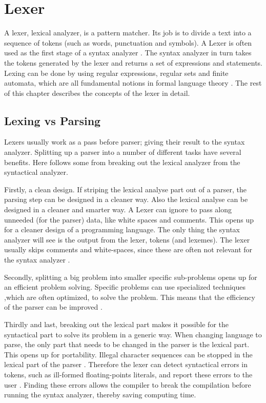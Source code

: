 \chapter{Lexer \label{chap:lexer}}
A lexer, lexical analyzer, is a pattern matcher. Its job is to divide a text
into a sequence of tokens (such as words, punctuation and symbols). A Lexer is
often used as the first stage of a syntax analyzer \cite{sebesta2012}. The syntax
analyzer in turn takes the tokens generated by the lexer and returns a set of
expressions and statements. Lexing can be done by using regular expressions,
regular sets and finite automata, which are all fundamental notions in
formal language theory \cite{Aho1990}. The rest of this chapter describes the
concepts of the lexer in detail.

\section{Lexing vs Parsing}
Lexers usually work as a pass before parser; giving their result to the syntax
analyzer. Splitting up a parser into a number of different tasks have several
benefits. Here follows some from breaking out the lexical analyzer from the
syntactical analyzer.

Firstly, a clean design. If striping the lexical analyse part out of a parser,
the parsing step can be designed in a cleaner way. Also the lexical analyse can
be designed in a cleaner and smarter way. A Lexer can ignore to pass along
unneeded (for the parser) data, like white spaces and comments. This opens up
for a cleaner design of a programming language. The only thing the syntax
analyzer will see is the output from the lexer, tokens (and lexemes). The lexer
usually skips comments and white-spaces, since these are often not relevant for
the syntax analyzer \cite{Aho2006}.

Secondly, splitting a big problem into smaller specific sub-problems opens up
for an efficient problem solving. Specific problems can use specialized techniques
,which are often optimized, to solve the problem. This means that the efficiency
of the parser can be improved \cite{Aho2006}.

Thirdly and last, breaking out the lexical part makes it possible for the
syntactical part to solve its problem in a generic way. When changing language
to parse, the only part that needs to be changed in the parser is the lexical
part. This opens up for portability. Illegal character sequences can be stopped
in the lexical part of the parser \cite{Aho2006}. Therefore the lexer can detect
syntactical errors in tokens, such as ill-formed floating-points literals, and
report these errors to the user \cite{sebesta2012}. Finding these errors allows
the compiler to break the compilation before running the syntax analyzer,
thereby saving computing time.

